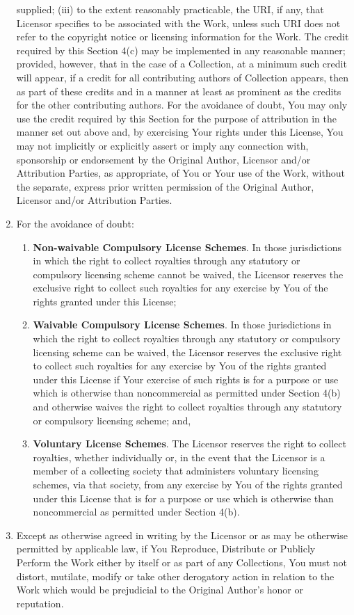 \begin{enumerate}
supplied; (iii) to the extent reasonably practicable, the
URI, if any, that Licensor specifies to be associated
with the Work, unless such URI does not refer to the
copyright notice or licensing information for the Work.
The credit required by this Section 4(c) may be
implemented in any reasonable manner; provided, however,
that in the case of a Collection, at a minimum such
credit will appear, if a credit for all contributing
authors of Collection appears, then as part of these
credits and in a manner at least as prominent as the
credits for the other contributing authors. For the
avoidance of doubt, You may only use the credit required
by this Section for the purpose of attribution in the
manner set out above and, by exercising Your rights under
this License, You may not implicitly or explicitly assert
or imply any connection with, sponsorship or endorsement
by the Original Author, Licensor and/or Attribution
Parties, as appropriate, of You or Your use of the Work,
without the separate, express prior written permission of
the Original Author, Licensor and/or Attribution
Parties.
\item 
\par For the avoidance of doubt:
\begin{enumerate}
\item \textbf{Non-waivable Compulsory License
Schemes}. In those jurisdictions in which the
right to collect royalties through any statutory or
compulsory licensing scheme cannot be waived, the
Licensor reserves the exclusive right to collect such
royalties for any exercise by You of the rights
granted under this License;
\item \textbf{Waivable Compulsory License
Schemes}. In those jurisdictions in which the
right to collect royalties through any statutory or
compulsory licensing scheme can be waived, the
Licensor reserves the exclusive right to collect such
royalties for any exercise by You of the rights
granted under this License if Your exercise of such
rights is for a purpose or use which is otherwise
than noncommercial as permitted under Section 4(b)
and otherwise waives the right to collect royalties
through any statutory or compulsory licensing scheme;
and,
\item \textbf{Voluntary License Schemes}. The
Licensor reserves the right to collect royalties,
whether individually or, in the event that the
Licensor is a member of a collecting society that
administers voluntary licensing schemes, via that
society, from any exercise by You of the rights
granted under this License that is for a purpose or
use which is otherwise than noncommercial as
permitted under Section 4(b).
\end{enumerate}

\item Except as otherwise agreed in writing by the Licensor
or as may be otherwise permitted by applicable law, if
You Reproduce, Distribute or Publicly Perform the Work
either by itself or as part of any Collections, You must
not distort, mutilate, modify or take other derogatory
action in relation to the Work which would be prejudicial
to the Original Author's honor or reputation.
\end{enumerate}
